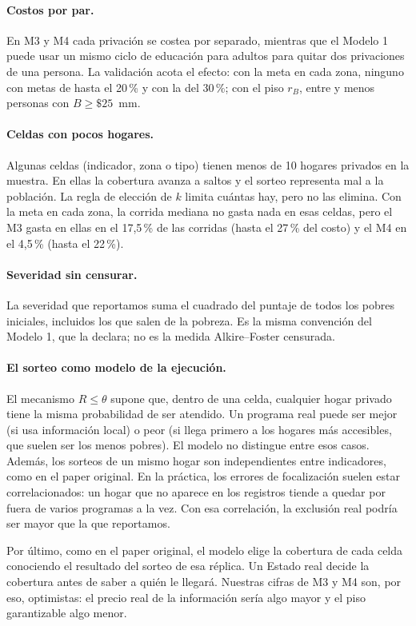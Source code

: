 \paragraph{Costos por par.} En M3 y M4 cada privación se costea por separado,
mientras que el Modelo 1 puede usar un mismo ciclo de educación para adultos para
quitar dos privaciones de una persona. La validación acota el efecto: con la meta en cada zona, ninguno con metas de
hasta el 20\,\% y \cGunoTreinta{} con la del 30\,\%; con el piso $r_B$,
entre \cGdosMin{} y \cGdosMax{} menos personas con $B\ge\$25$~mm.

\paragraph{Celdas con pocos hogares.} Algunas celdas (indicador, zona o tipo)
tienen menos de 10 hogares privados en la muestra. En ellas la cobertura avanza a
saltos y el sorteo representa mal a la población. La regla de elección de $k$
limita cuántas hay, pero no las elimina. Con la meta en cada zona, la corrida
mediana no gasta nada en esas celdas, pero el M3 gasta en ellas en el 17,5\,\% de
las corridas (hasta el 27\,\% del costo) y el M4 en el 4,5\,\% (hasta el
22\,\%).

\paragraph{Severidad sin censurar.} La severidad que reportamos suma el cuadrado
del puntaje de todos los pobres iniciales, incluidos los que salen de la pobreza.
Es la misma convención del Modelo 1, que la declara; no es la medida
Alkire--Foster censurada.

\paragraph{El sorteo como modelo de la ejecución.} El mecanismo $R\le\theta$ supone
que, dentro de una celda, cualquier hogar privado tiene la misma probabilidad de
ser atendido. Un programa real puede ser mejor (si usa información local) o peor
(si llega primero a los hogares más accesibles, que suelen ser los menos pobres).
El modelo no distingue entre esos casos. Además, los sorteos de un mismo hogar son independientes
entre indicadores, como en el paper original. En la práctica, los errores de
focalización suelen estar correlacionados: un hogar que no aparece en los
registros tiende a quedar por fuera de varios programas a la vez. Con esa
correlación, la exclusión real podría ser mayor que la que reportamos.

Por último, como en el paper original, el modelo elige la cobertura de cada celda
conociendo el resultado del sorteo de esa réplica. Un Estado real decide la
cobertura antes de saber a quién le llegará. Nuestras cifras de M3 y M4 son, por
eso, optimistas: el precio real de la información sería algo mayor y el piso
garantizable algo menor.
